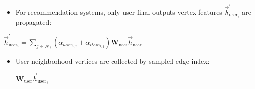 \documentclass{beamer}
\begin{document}

\begin{frame}[fragile]
\begin{itemize}
\frametitle{(3) Aggregation: Case Study}
[ball]

\item For recommendation systems, only user final outputs vertex features $\overrightarrow{h}_{\text{user}_i}^{'}$ are propagated:

\end{itemize}

\vspace{0.3cm}

\begin{center}
    $\overrightarrow{h}_{\text{user}_i}^{'} = \sum_{j \in \mathcal{N}_{i}} (\alpha_{user_{i,j}}+\alpha_{item_{i,j}}) \mathbf{W}_{\text{user}}\overrightarrow{h}_{\text{user}_j}$
\end{center}

\end{frame}


\begin{frame}[fragile]
\begin{itemize}
\frametitle{(3) Aggregation: Code}
[ball]

\item User neighborhood vertices are collected by sampled edge index:

\vspace{0.3cm}

\hspace{4cm} $\mathbf{W}_{\text{user}}\overrightarrow{h}_{\text{user}_j}$


\end{itemize}
\end{frame}

\end{document}
